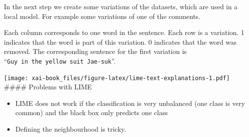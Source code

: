 \documentclass[12pt,]{krantz}
\providecommand{\tightlist}{%
  \setlength{\itemsep}{0pt}\setlength{\parskip}{0pt}}
\theoremstyle{definition}
\theoremstyle{definition}
\theoremstyle{definition}
\theoremstyle{remark}
\begin{document}
In the next step we create some variations of the datasets, which are
used in a local model. For example some variations of one of the
comments.

\hypertarget{htmlwidget-d2a25d7a243dd7d0fdba}{}

Each column corresponds to one word in the sentence. Each row is a
variation. 1 indicates that the word is part of this variation. 0
indicates that the word was removed. The corresponding sentence for the
first variation is ``\texttt{Guy\ in\ the\ yellow\ suit\ Jae-suk}''.

\texttt{[image: xai-book\_files/figure-latex/lime-text-explanations-1.pdf]}
\#\#\#\# Problems with LIME

\begin{itemize}
\tightlist
\item
  LIME does not work if the classification is very unbalanced (one class
  is very common) and the black box only predicts one class
\item
  Defining the neighbourhood is tricky.
\end{itemize}



\backmatter
\end{document}

